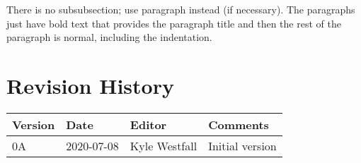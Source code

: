 \documentclass[11pt,a4paper,twoside,onecolumn,openany,final,oldfontcommands]{memoir}
\begin{document}
There is no {\ttfamily subsubsection}; use {\ttfamily paragraph} instead (if necessary).  The paragraphs just have bold text that provides the paragraph title and then the rest of the paragraph is normal, including the indentation.

\newpage

\chapter*{Revision History}

\begin{table}[hp]{%
\begin{tabular}{l | l | l |  p{22pc}} \toprule
{\bf Version} & {\bf Date} & {\bf Editor} & {\bf Comments} \\ \midrule
0A & 2020-07-08 & Kyle Westfall & Initial version \\ \bottomrule
\end{tabular}}
\end{table}



\end{document}
